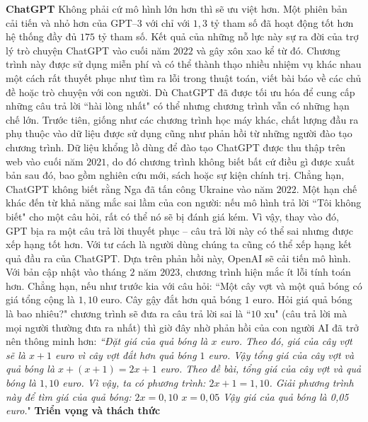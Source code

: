 \begin{multicols}{2}
	\vskip 0.1cm
	\textbf{\color{timhieukhoahoc}ChatGPT}
	\vskip 0.1cm
	Không phải cứ mô hình lớn hơn thì sẽ ưu việt hơn. Một phiên bản cải tiến và nhỏ hơn của GPT--$3$ với chỉ với $1,3$ tỷ tham số đã hoạt động tốt hơn hệ thống đầy đủ $175$ tỷ tham số. Kết quả của những nỗ lực này sự ra đời của trợ lý trò chuyện ChatGPT vào cuối năm $2022$ và gây xôn xao kể từ đó. Chương trình này được sử dụng miễn phí và có thể thành thạo nhiều nhiệm vụ khác nhau một cách rất thuyết phục như tìm ra lỗi trong thuật toán, viết bài báo về các chủ đề hoặc trò chuyện với con người.
	\vskip 0.1cm
	Dù ChatGPT đã được tối ưu hóa để cung cấp những câu trả lời ``hài lòng nhất" có thể nhưng chương trình vẫn có những hạn chế lớn. Trước tiên, giống như các chương trình học máy khác, chất lượng đầu ra phụ thuộc vào dữ liệu được sử dụng cũng như phản hồi từ những người đào tạo chương trình. Dữ liệu khổng lồ dùng để đào tạo ChatGPT được thu thập trên web vào cuối năm $2021$, do đó chương trình không biết bất cứ điều gì được xuất bản sau đó, bao gồm nghiên cứu mới, sách hoặc sự kiện chính trị. Chẳng hạn, ChatGPT không biết rằng Nga đã tấn công Ukraine vào năm $2022$. Một hạn chế khác đến từ khả năng mắc sai lầm của con người: nếu mô hình trả lời ``Tôi không biết" cho một câu hỏi, rất có thể nó sẽ bị đánh giá kém. Vì vậy, thay vào đó, GPT bịa ra một câu trả lời thuyết phục -- câu trả lời này có thể sai nhưng được xếp hạng tốt hơn.
	\vskip 0.1cm
	Với tư cách là người dùng chúng ta cũng có thể xếp hạng kết quả đầu ra của ChatGPT. Dựa trên phản hồi này, OpenAI sẽ cải tiến mô hình. Với bản cập nhật vào tháng $2$ năm $2023$, chương trình hiện mắc ít lỗi tính toán hơn. Chẳng hạn, nếu như trước kia với câu hỏi: ``Một cây vợt và một quả bóng có giá tổng cộng là $1,10$ euro. Cây gậy đắt hơn quả bóng $1$ euro. Hỏi giá quả bóng là bao nhiêu?" chương trình sẽ đưa ra câu trả lời sai là ``$10$ xu" (câu trả lời mà mọi người thường đưa ra nhất) thì giờ đây nhờ phản hồi của con người AI đã trở nên thông minh hơn:
	\vskip 0.1cm
	{\itshape
		``Đặt giá của quả bóng là $x$ euro. Theo đó, giá của cây vợt sẽ là $x+1$ euro vì cây vợt đắt hơn quả bóng $1$ euro.
		\vskip 0.1cm
		Vậy tổng giá của cây vợt và quả bóng là $x+(x+1)=2x+1$ euro.
		\vskip 0.1cm
		Theo đề bài, tổng giá của cây vợt và quả bóng là $1,10$ euro. Vì vậy, ta có phương trình:
		\vskip 0.1cm
		$2x+1=1,10$.
		\vskip 0.1cm
		Giải phương trình này để tìm giá của quả bóng:
		\vskip 0.1cm
		$2x=0,10$
		\vskip 0.1cm
		$x=0,05$
		\vskip 0.1cm
		Vậy giá của quả bóng là 0,05 euro.}"
	\vskip 0.1cm
	\textbf{\color{timhieukhoahoc}Triển vọng và thách thức}
	\vskip 0.1cm

\end{multicols}
